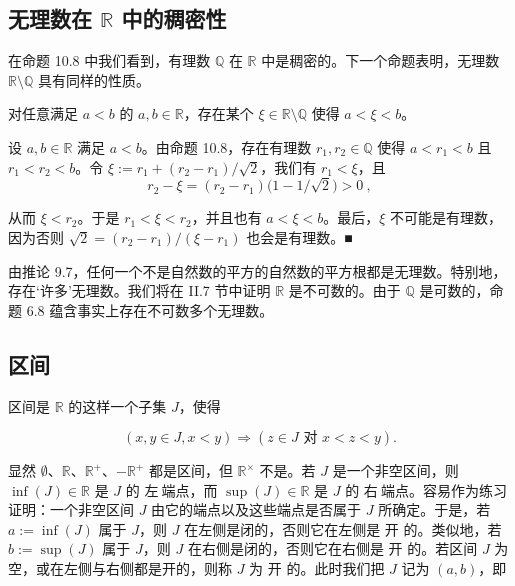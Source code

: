 \subsection*{无理数在 $ \mathbb{R} $ 中的稠密性}

在命题 10.8 中我们看到，有理数 $ \mathbb{Q} $ 在 $ \mathbb{R} $ 中是稠密的。下一个命题表明，无理数 $ \mathbb{R} \setminus \mathbb{Q} $ 具有同样的性质。

\begin{proposition}

对任意满足 $ a < b $ 的 $ a, b \in \mathbb{R} $，存在某个 $ \xi \in \mathbb{R} \setminus \mathbb{Q} $ 使得 $ a < \xi < b $。

\proofhead
设 $ a, b \in \mathbb{R} $ 满足 $ a < b $。由命题 10.8，存在有理数 $ r_1, r_2 \in \mathbb{Q} $ 使得 $ a < r_1 < b $ 且 $ r_1 < r_2 < b $。令 $ \xi := r_1 + (r_2 - r_1) / \sqrt{2} $，我们有 $ r_1 < \xi $，且
\[
r_{2}-\xi=(r_{2}-r_{1})\big(1-1/\sqrt{2}\big)>0~,
\]

从而 $ \xi < r_2 $。于是 $ r_1 < \xi < r_2 $，并且也有 $ a < \xi < b $。最后，$ \xi $ 不可能是有理数，因为否则 $ \sqrt{2} = (r_2 - r_1)/(\xi - r_1) $ 也会是有理数。■

\end{proposition}

由推论 9.7，任何一个不是自然数的平方的自然数的平方根都是无理数。特别地，存在‘许多’无理数。我们将在 II.7 节中证明 $ \mathbb{R} $ 是不可数的。由于 $ \mathbb{Q} $ 是可数的，命题 6.8 蕴含事实上存在不可数多个无理数。

\subsection*{区间}

区间是 $ \mathbb{R} $ 的这样一个子集 $ J $，使得

\[
(x,y\in J,x<y)\Rightarrow(z\in J\text{ 对 }x<z<y).
\]

显然 $ \emptyset $、$ \mathbb{R} $、$ \mathbb{R}^+ $、$ -\mathbb{R}^+ $ 都是区间，但 $ \mathbb{R}^× $ 不是。若 $ J $ 是一个非空区间，则 $ \inf(J) \in \mathbb{R} $ 是 $ J $ 的 $ \text{左}\ \text{端点} $，而 $ \sup(J) \in \mathbb{R} $ 是 $ J $ 的 $ \text{右}\ \text{端点} $。容易作为练习证明：一个非空区间 $ J $ 由它的端点以及这些端点是否属于 $ J $ 所确定。于是，若 $ a := \inf(J) $ 属于 $ J $，则 $ J $ 在左侧是闭的，否则它在左侧是 $ \text{开} $ 的。类似地，若 $ b := \sup(J) $ 属于 $ J $，则 $ J $ 在右侧是闭的，否则它在右侧是 $ \text{开} $ 的。若区间 $ J $ 为空，或在左侧与右侧都是开的，则称 $ J $ 为 $ \text{开} $ 的。此时我们把 $ J $ 记为 $ (a, b) $，即

